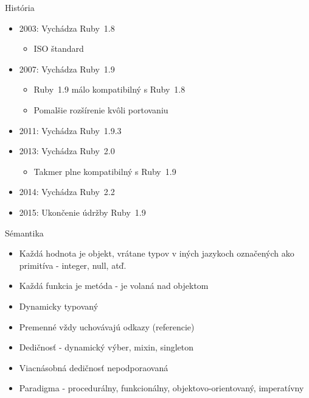 \documentclass[pdf,slideColor,fyma]{prosper}
\begin{document}
\begin{slide}{História}
\begin{itemize}
  \item{2003: Vychádza Ruby~1.8}
  \begin{itemize}
    \item{ISO štandard}
  \end{itemize}
  \item{2007: Vychádza Ruby~1.9}
  \begin{itemize}
    \item{Ruby~1.9 málo kompatibilný s Ruby~1.8}
    \item{Pomalšie rozšírenie kvôli portovaniu}
  \end{itemize}
  \item{2011: Vychádza Ruby~1.9.3}
  \item{2013: Vychádza Ruby~2.0}
  \begin{itemize}
    \item{Takmer plne kompatibilný s Ruby~1.9}
  \end{itemize}
  \item{2014: Vychádza Ruby~2.2}
  \item{2015: Ukončenie údržby Ruby~1.9}
\end{itemize}
\end{slide}

\begin{slide}{Sémantika}
\begin{itemize}
  \item{Každá hodnota je objekt, vrátane typov v iných jazykoch označených ako primitíva - integer, null, atď.}
  \item{Každá funkcia je metóda - je volaná nad objektom}
  \item{Dynamicky typovaný}
  \item{Premenné vždy uchovávajú odkazy (referencie)}
  \item{Dedičnosť - dynamický výber, mixin, singleton}
  \item{Viacnásobná dedičnosť nepodporaovaná}
  \item{Paradigma - procedurálny, funkcionálny, objektovo-orientovaný, imperatívny}
\end{itemize}
\end{slide}
\end{document}
